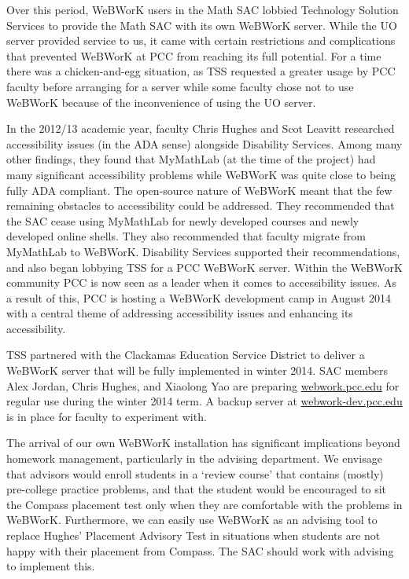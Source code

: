 Over this period, WeBWorK users in the Math SAC lobbied Technology Solution Services to provide the Math SAC with its own WeBWorK server. While the UO server provided service to us, it came with certain restrictions and complications that prevented WeBWorK at PCC from reaching its full potential. For a time there was a chicken-and-egg situation, as TSS requested a greater usage by PCC faculty before arranging for a server while some faculty chose not to use WeBWorK because of the inconvenience of using the UO server.

In the 2012/13 academic year, faculty Chris Hughes and Scot Leavitt researched accessibility issues (in the ADA sense) alongside Disability Services.  Among many other findings, they found that MyMathLab (at the time of the project) had many significant accessibility problems while WeBWorK was quite close to being fully ADA compliant. The open-source nature of WeBWorK meant that the few remaining obstacles to accessibility could be addressed. They recommended that the SAC cease using MyMathLab for newly developed courses and newly developed online shells. They also recommended that faculty migrate from MyMathLab to WeBWorK. Disability Services supported their recommendations, and also began lobbying TSS for a PCC WeBWorK server. Within the WeBWorK community PCC is now seen as a leader when it comes to accessibility issues. As a result of this, PCC is hosting a WeBWorK development camp in August 2014 with a central theme of addressing accessibility issues and enhancing its accessibility.

TSS partnered with the Clackamas Education Service District to deliver a WeBWorK server that will be fully implemented in winter 2014.  SAC members Alex Jordan, Chris Hughes, and Xiaolong Yao are preparing \href{http://webwork.pcc.edu}{webwork.pcc.edu} for regular use during the winter 2014 term. A backup server at \href{http://webwork-dev.pcc.edu}{webwork-dev.pcc.edu} is in place for faculty to experiment with. 

The arrival of our own WeBWorK installation has significant implications beyond homework management, particularly in the advising department. We envisage that advisors would enroll students in a `review course' that contains (mostly) pre-college practice problems, and that the student would be encouraged to sit the Compass placement test only when they are comfortable with the problems in WeBWorK. Furthermore, we can easily use WeBWorK as an advising tool to replace Hughes' Placement Advisory Test in situations when students are not happy with their placement from Compass.  The SAC should work with advising to implement this. 

